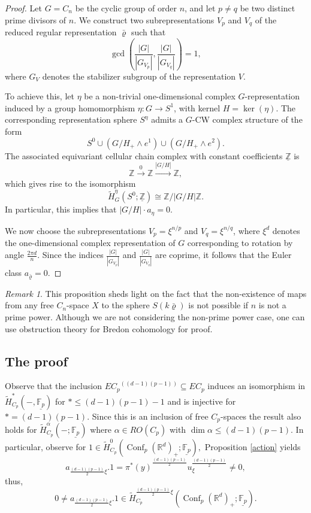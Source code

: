 \documentclass[a4paper,leqno,11pt]{amsart}
\renewcommand{\rho}{\varrho}
\newcommand{\bF}{\mathbb{F}}
\newcommand{\bR}{\mathbb{R}}
\newcommand{\bFp}{\bF_p}
\newcommand{\uFp}{\underline{\bFp}}
\newcommand{\uZ}{\underline{\mathbb{Z}}}
\newcommand{\Conf}{\operatorname{Conf}}
\newenvironment{myeq}[1][]
{\stepcounter{theorem}\begin{equation}\tag{\thetheorem}{#1}}
{\end{equation}}
\theoremstyle{plain}
\theoremstyle{definition}
\theoremstyle{remark}
\newtheorem{remark}[theorem]{Remark}
\begin{document}
\begin{proof}
Let \( G = C_n \) be the cyclic group of order \( n \), and let \( p \neq q \) be two distinct prime divisors of \( n \). We construct two subrepresentations \( V_p \) and \( V_q \) of the reduced regular representation \( \bar{\rho} \) such that
\[
\gcd\left( \frac{|G|}{|G_{V_p}|}, \frac{|G|}{|G_{V_q}|} \right) = 1,
\]
where \( G_V \) denotes the stabilizer subgroup of the representation \( V \).

To achieve this, let \( \eta \) be a non-trivial one-dimensional complex \( G \)-representation induced by a group homomorphism \( \eta \colon G \to S^1 \), with kernel \( H = \ker(\eta) \). The corresponding representation sphere \( S^\eta \) admits a \( G \)-CW complex structure of the form
\[
S^0 \cup (G/H_+ \wedge e^1) \cup (G/H_+ \wedge e^2).
\]
The associated equivariant cellular chain complex with constant coefficients \( \uZ \) is
\[
\mathbb{Z} \xrightarrow{0} \mathbb{Z} \xrightarrow{|G/H|} \mathbb{Z},
\]
which gives rise to the isomorphism
\[
\tilde{H}^\eta_G(S^0; \uZ) \cong \mathbb{Z}/|G/H|\mathbb{Z}.
\]
In particular, this implies that \( |G/H| \cdot a_\eta = 0 \).

We now choose the subrepresentations \( V_p = \xi^{n/p} \) and \( V_q = \xi^{n/q} \), where \( \xi^d \) denotes the one-dimensional complex representation of \( G \) corresponding to rotation by angle \( \frac{2\pi d}{n} \). Since the indices \( \frac{|G|}{|G_{V_p}|} \) and \( \frac{|G|}{|G_{V_q}|} \) are coprime, it follows that the Euler class \( a_{\bar{\rho}} = 0 \).
\end{proof}


\begin{remark}
This proposition sheds light on the fact that the non-existence of maps from any free $C_n$-space $X$  to the sphere $S(k\bar{\rho})$ is not possible if $n$ is not a prime power. Although we are not considering the non-prime power case, one can use obstruction theory for Bredon cohomology for proof.
\end{remark}







\subsection{The proof}
Observe that the inclusion ${EC_p}^{((d-1)(p-1))} \subseteq EC_p$ induces an isomorphism in $\tilde{H}^\ast_{C_p}(-, \uFp)$ for $\ast \leq (d-1)(p-1)-1$ and is injective for $\ast = (d-1)(p-1).$ Since this is an inclusion of free $C_p$-spaces the result also holds for $\tilde{H}^\alpha_{C_p}(-; \uFp)$ where $\alpha \in RO(C_p)$ with $\dim \alpha \leq (d-1)(p-1).$ In particular,  observe for $1 \in \tilde{H}^0_{C_p}({\Conf_p(\bR^d)}_+; \uFp),$ Proposition \ref{action} yields 
 $$a_{\frac{(d-1)(p-1)}{2} \xi} . 1= {\pi^\ast(y)}^{\frac{(d-1)(p-1)}{2}}u_\xi^{\frac{(d-1)(p-1)}{2}} \neq 0,$$
thus, 
\begin{myeq} \label{acteg} 
0\neq a_{\frac{(d-1)(p-1)}{2} \xi} . 1 \in \tilde{H}^{\frac{(d-1)(p-1)}{2}\xi}_{C_p}({\Conf_p(\bR^d)}_+; \uFp).
\end{myeq}
\end{document}
